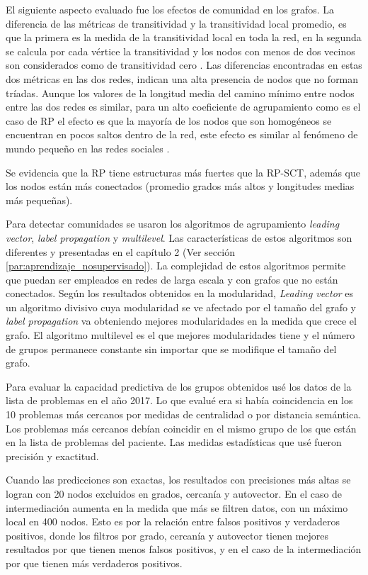 El siguiente aspecto evaluado fue los efectos de comunidad en los grafos. La diferencia de las métricas de transitividad y la transitividad local promedio, es que la primera es la medida de la transitividad local en toda la red, en la segunda se calcula por cada vértice la transitividad y los nodos con menos de dos vecinos son considerados como de transitividad cero \cite{Watts1998}. Las diferencias encontradas en  estas dos métricas en las dos redes, indican una alta presencia de nodos que no forman tríadas. Aunque los valores de la longitud media del camino mínimo entre nodos entre las dos redes es similar, para un alto coeficiente de agrupamiento como es el caso de \acrshort{RP} el efecto es que la mayoría de los nodos que son homogéneos se encuentran en pocos saltos dentro de la red, este efecto es similar al fenómeno de mundo pequeño en las redes sociales \cite{Cook2006}. 

Se evidencia que la \acrshort{RP} tiene estructuras más fuertes que la \acrshort{RP-SCT}, además que los nodos están más conectados (promedio grados más altos y longitudes medias más pequeñas). 

Para detectar comunidades se usaron los  algoritmos de agrupamiento \textit{leading vector}, \textit{label propagation} y \textit{multilevel}. Las características de estos algoritmos son diferentes y presentadas en el capítulo 2 (Ver sección \ref{par:aprendizaje_nosupervisado}). La complejidad de estos algoritmos permite que puedan ser empleados en redes de larga escala y con grafos que no están conectados. Según los resultados obtenidos en la modularidad, \textit{Leading vector} es un algoritmo divisivo cuya modularidad se ve afectado por el tamaño del grafo y \textit{label propagation} va obteniendo mejores modularidades en la medida que crece el grafo. El algoritmo {multilevel} es el que mejores modularidades tiene y el número de grupos permanece constante sin importar que se modifique el tamaño del grafo.

Para evaluar la capacidad predictiva de los grupos obtenidos usé los datos de la lista de problemas en el año 2017. Lo que evalué era si había coincidencia en los 10  problemas más cercanos por medidas de centralidad o por distancia semántica. Los problemas más cercanos debían coincidir en el mismo grupo de los que están en la lista de problemas del paciente. Las medidas estadísticas que usé fueron precisión y exactitud. 

Cuando las predicciones son exactas, los resultados con precisiones más altas se logran con 20 nodos excluidos en grados, cercanía y autovector. En el caso de intermediación aumenta en la medida que más se filtren datos, con un máximo local en 400 nodos. Esto es por la relación entre falsos positivos y verdaderos positivos,  donde los filtros por grado, cercanía y autovector tienen mejores resultados por que tienen menos falsos positivos, y en el caso de la intermediación por que tienen más verdaderos positivos. 

